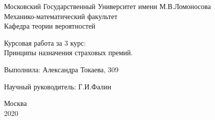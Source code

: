 \documentclass[12pt,a4paper]{article}
\begin{document}
\begin{titlepage}

 \begin{center}
 Московский Государственный Университет имени М.В.Ломоносова \\
Механико-математический факультет\\
Кафедра теории вероятностей
  \end{center}

 \vspace{3cm}
 
 \begin{center}
   
  {  Курсовая работа за 3 курс:\\
  Принципы назначения страховых премий.}
   
    \vspace{5cm}
\end{center}     
   
     
   \hspace{170pt}  {Выполнила: Александра Токаева,  309 \\}
       
 \vspace{0.1cm}
  \hspace{170pt} 	  Научный руководитель:  Г.И.Фалин\\

\vspace{4cm}

  \begin{center}
  {Москва\\
  2020}
  \end{center}  
 
 
\end{titlepage}
\end{document}
